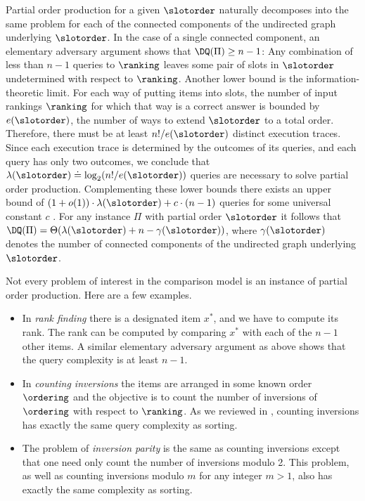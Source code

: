 Partial order production for a given $\slotorder$ naturally decomposes into the same problem for each of the connected components of the undirected graph underlying $\slotorder$. In the case of a single connected component, an elementary adversary argument shows that $\DQ(\Pi) \ge n-1$: Any combination of less than $n-1$ queries to $\ranking$ leaves some pair of slots in $\slotorder$ undetermined with respect to $\ranking$. Another lower bound is the information-theoretic limit. For each way of putting items into slots, the number of input rankings $\ranking$ for which that way is a correct answer is bounded by $e(\slotorder)$, the number of ways to extend $\slotorder$ to a total order. Therefore, there must be at least $n!/e(\slotorder)$ distinct execution traces. Since each execution trace is determined by the outcomes of its queries, and each query has only two outcomes, we conclude that $\lambda(\slotorder) \doteq \log_2(n!/e(\slotorder))$ queries are necessary to solve partial order production. Complementing these lower bounds there exists an upper bound of $(1 + o(1))\cdot \lambda(\slotorder) + c \cdot (n-1)$ queries for some universal constant $c$ \cite{CFJJM2008}. For any
%
instance $\Pi$ with partial order $\slotorder$ it follows that $\DQ(\Pi)= \Theta(\lambda(\slotorder) + n - \gamma(\slotorder))$, where $\gamma(\slotorder)$ denotes the number of connected components of the undirected graph underlying $\slotorder$. 

Not every problem of interest in the comparison model is an instance of partial order production. Here are a few examples.
\begin{itemize}
\item In \emph{rank finding} there is a designated item $x^*$, and we have to compute its rank. The rank can be computed by comparing $x^*$ with each of the $n-1$ other items. A similar elementary adversary argument as above shows that the query complexity is at least $n-1$.
\item In \emph{counting inversions} the items are arranged in some known order $\ordering$ and the objective is to count the number of inversions of $\ordering$ with respect to $\ranking$. As we reviewed in , counting inversions has exactly the same query complexity as sorting.
\item The problem of \emph{inversion parity} is the same as counting inversions except that one need only count the number of inversions modulo 2. This problem, as well as counting inversions modulo $m$ for any integer $m > 1$, also has exactly the same complexity as sorting.
\end{itemize}

